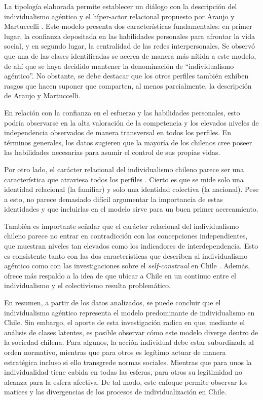 \documentclass[12pt,twoside]{templates/facsothesis}
\begin{document}
La tipología elaborada permite establecer un diálogo con la descripción del individualismo agéntico y el híper-actor relacional propuesto por Araujo y Martuccelli \citeyearpar{araujo2020}. Este modelo presenta dos características fundamentales: en primer lugar, la confianza depositada en las habilidades personales para afrontar la vida social, y en segundo lugar, la centralidad de las redes interpersonales. Se observó que una de las clases identificadas se acerca de manera más nítida a este modelo, de ahí que se haya decidido mantener la denominación de ``individualismo agéntico''. No obstante, se debe destacar que los otros perfiles también exhiben rasgos que hacen suponer que comparten, al menos parcialmente, la descripción de Araujo y Martuccelli.

En relación con la confianza en el esfuerzo y las habilidades personales, esto podría observarse en la alta valoración de la competencia y los elevados niveles de independencia observados de manera transversal en todos los perfiles. En términos generales, los datos sugieren que la mayoría de los chilenos cree poseer las habilidades necesarias para asumir el control de sus propias vidas.

Por otro lado, el carácter relacional del individualismo chileno parece ser una característica que atraviesa todos los perfiles \citep{araujo2014}. Cierto es que se mide solo una identidad relacional (la familiar) y solo una identidad colectiva (la nacional). Pese a esto, no parece demasiado difícil argumentar la importancia de estas identidades y que incluirlas en el modelo sirve para un buen primer acercamiento.

También es importante señalar que el carácter relacional del individualismo chileno parece no entrar en contradicción con las concepciones independientes, que muestran niveles tan elevados como los indicadores de interdependencia. Esto es consistente tanto con las dos características que describen al individualismo agéntico \citep{araujo2020} como con las investigaciones sobre el \emph{self-construal} en Chile \citep{benavides2020, kolstad2009}. Además, ofrece más respaldo a la idea de que ubicar a Chile en un continuo entre el individualismo y el colectivismo resulta problemático.

En resumen, a partir de los datos analizados, se puede concluir que el individualismo agéntico representa el modelo predominante de individualismo en Chile. Sin embargo, el aporte de esta investigación radica en que, mediante el análisis de clases latentes, es posible observar cómo este modelo diverge dentro de la sociedad chilena. Para algunos, la acción individual debe estar subordinada al orden normativo, mientras que para otros es legítimo actuar de manera estratégica incluso si ello transgrede normas sociales. Mientras que para unos la individualidad tiene cabida en todas las esferas, para otros su legitimidad no alcanza para la esfera afectiva. De tal modo, este enfoque permite observar los matices y las divergencias de los procesos de individualización en Chile.
\end{document}
